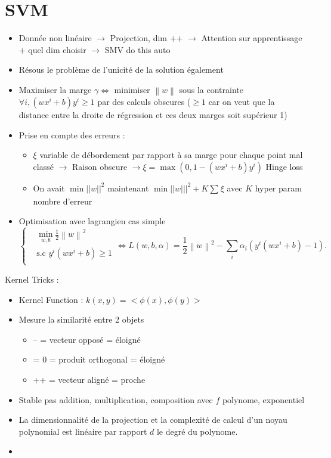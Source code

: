 \documentclass{article}
\theoremstyle{plain}%
\theoremstyle{definition}
\theoremstyle{remark}
\begin{document}
\section{SVM}
\begin{itemize}
    \item Donnée non linéaire $\rightarrow$ Projection, dim ++ $\rightarrow$ Attention sur apprentissage + quel dim choisir $\rightarrow$ SMV do this auto
    \item Résous le problème de l'unicité de la solution également
    \item Maximiser la marge $ \gamma  \Leftrightarrow $ minimiser $ \left\| w \right\| $ sous la contrainte $ \forall i, (wx^i + b)y^i \geq 1 $ par des calculs obscures ($ \geq 1 $ car on veut que la distance entre la droite de régression et ces deux marges soit supérieur 1)
    \item Prise en compte des erreurs : \begin{itemize}
        \item $ \xi  $ variable de débordement par rapport à sa marge pour chaque point mal classé $\rightarrow$ Raison obscure $\rightarrow \xi = \max (0, 1 - (wx^i + b) y^i) $ Hinge loss
        \item On avait $\min ||w||^2$ maintenant $\min ||w|||^2 + K \sum_{}^{}\xi $ avec $K$ hyper param nombre d'erreur
    \end{itemize}
    \item Optimisation avec lagrangien cas simple
    \[
        \begin{cases}
        & \min _{w,b} \frac{1}{2}\left\| w \right\| ^2\\
        &\text{s.c } y^i (wx^i + b) \geq 1\\
        \end{cases} 
        \Leftrightarrow L(w, b, \alpha) = \frac{1}{2} \left\| w \right\| ^2 - \sum_{i}^{}\alpha _i (y^i (wx^i + b) - 1)
    .\]
\end{itemize}
Kernel Tricks : 
\begin{itemize}
    \item Kernel Function : $ k(x,y) = <\phi (x), \phi(y)> $
    \item Mesure la similarité entre 2 objets \begin{itemize}
        \item -- = vecteur opposé = éloigné
        \item = 0 = produit orthogonal = éloigné 
        \item ++ = vecteur aligné = proche
    \end{itemize}
    \item Stable pas addition, multiplication, composition avec $ f $ polynome, exponentiel
    \item La dimensionnalité de la projection et la complexité de calcul d'un noyau polynomial est linéaire par rapport $d$ le degré du polynome.
    \item 
\end{itemize}
\end{document}
